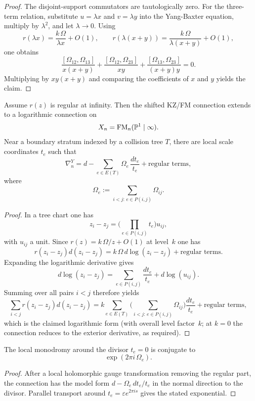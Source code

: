 \begin{proof}
The disjoint-support commutators are tautologically zero. For the three-term relation, substitute $u=\lambda x$ and $v=\lambda y$ into the Yang-Baxter equation, multiply by $\lambda^2$, and let $\lambda\to 0$. Using
\[
 r(\lambda x)=\frac{k\,\Omega}{\lambda x}+O(1),
 \qquad
 r(\lambda(x+y))=\frac{k\,\Omega}{\lambda(x+y)}+O(1),
\]
one obtains
\[
 \frac{[\Omega_{12},\Omega_{13}]}{x(x+y)}+
 \frac{[\Omega_{12},\Omega_{23}]}{xy}+
 \frac{[\Omega_{13},\Omega_{23}]}{(x+y)y}=0.
\]
Multiplying by $xy(x+y)$ and comparing the coefficients of $x$ and $y$ yields the claim.
\end{proof}

\begin{proposition}\label{prop:strict-log-ext}
Assume $r(z)$ is regular at infinity. Then the shifted KZ/FM connection extends to a logarithmic connection on
\[
 X_n=\mathrm{FM}_n(\mathbb P^1\mid\infty).
\]
Near a boundary stratum indexed by a collision tree $T$, there are local scale coordinates $t_e$ such that
\[
 \nabla_n^Y = d-\sum_{e\in E(T)} \Omega_e\,\frac{dt_e}{t_e}+\text{regular terms},
\]
where
\[
 \Omega_e:=\sum_{i<j:\,e\in P(i,j)}\Omega_{ij}.
\]
\end{proposition}

\begin{proof}
In a tree chart one has
\[
 z_i-z_j = \Big(\prod_{e\in P(i,j)}t_e\Big)u_{ij},
\]
with $u_{ij}$ a unit. Since $r(z)=k\,\Omega/z+O(1)$ at level~$k$ one has
\[
 r(z_i-z_j)d(z_i-z_j)=k\,\Omega\,d\log(z_i-z_j)+\text{regular terms}.
\]
Expanding the logarithmic derivative gives
\[
 d\log(z_i-z_j)=\sum_{e\in P(i,j)}\frac{dt_e}{t_e}+d\log(u_{ij}).
\]
Summing over all pairs $i<j$ therefore yields
\[
 \sum_{i<j}r(z_i-z_j)d(z_i-z_j)=k\sum_{e\in E(T)}\Big(\sum_{i<j:\,e\in P(i,j)}\Omega_{ij}\Big)\frac{dt_e}{t_e}+\text{regular terms},
\]
which is the claimed logarithmic form \textup{(}with overall level factor~$k$; at $k=0$ the connection reduces to the exterior derivative, as required\textup{)}.
\end{proof}

\begin{corollary}\label{cor:strict-monodromy}
The local monodromy around the divisor $t_e=0$ is conjugate to
\[
 \exp(2\pi i\,\Omega_e).
\]
\end{corollary}

\begin{proof}
After a local holomorphic gauge transformation removing the regular part, the connection has the model form $d-\Omega_e\,dt_e/t_e$ in the normal direction to the divisor. Parallel transport around $t_e=\varepsilon e^{2\pi i s}$ gives the stated exponential.
\end{proof}

